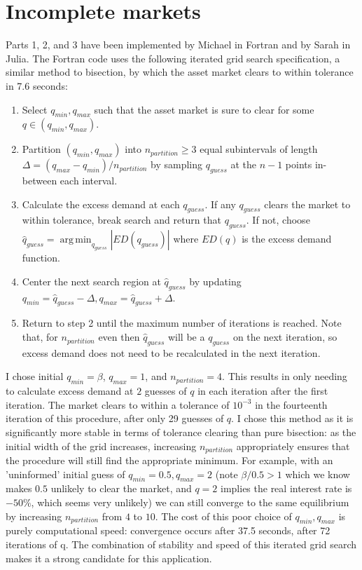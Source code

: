\documentclass[11pt]{article} %
\DeclareMathOperator*{\argmin}{arg\,min}
\begin{document}
\section{Incomplete markets}
Parts 1, 2, and 3 have been implemented by Michael in Fortran and by Sarah in Julia. The Fortran code uses the following iterated grid search specification, a similar method to bisection, by which the asset market clears to within tolerance in 7.6 seconds:
\begin{enumerate}
\item Select $q_{min}, q_{max}$ such that the asset market is sure to clear for some $q \in (q_{min},q_{max})$.
\item Partition $(q_{min},q_{max})$ into $n_{partition}\geq 3$ equal subintervals of length $\Delta = (q_{max}-q_{min})/n_{partition}$ by sampling $q_{guess}$ at the $n-1$ points in-between each interval.
\item Calculate the excess demand at each $q_{guess}$. If any $q_{guess}$ clears the market to within tolerance, break search and return that $q_{guess}$. If not, choose $\hat{q}_{guess} = \argmin_{q_{guess}} |ED(q_{guess})|$ where $ED(q)$ is the excess demand function.
\item Center the next search region at $\hat{q}_{guess}$ by updating $q_{min} = \hat{q}_{guess} - \Delta, q_{max} = \hat{q}_{guess} + \Delta$.
\item Return to step 2 until the maximum number of iterations is reached. Note that, for $n_{partition}$ even then $\hat{q}_{guess}$ will be a $q_{guess}$ on the next iteration, so excess demand does not need to be recalculated in the next iteration.
\end{enumerate}

I chose initial $q_{min} = \beta$, $q_{max} = 1$, and $n_{partition} = 4$. This results in only needing to calculate excess demand at $2$ guesses of $q$ in each iteration after the first iteration. The market clears to within a tolerance of $10^{-3}$ in the fourteenth iteration of this procedure, after only 29 guesses of $q$. I chose this method as it is significantly more stable in terms of tolerance clearing than pure bisection: as the initial width of the grid increases, increasing $n_{partition}$ appropriately ensures that the procedure will still find the appropriate minimum. For example, with an 'uninformed' initial guess of $q_{min}=0.5,q_{max} = 2$ (note $\beta/0.5>1$ which we know makes $0.5$ unlikely to clear the market, and $q=2$ implies the real interest rate is $-50\%$, which seems very unlikely) we can still converge to the same equilibrium by increasing $n_{partition}$ from $4$ to $10$. The cost of this poor choice of $q_{min},q_{max}$ is purely computational speed: convergence occurs after 37.5 seconds, after 72 iterations of q. The combination of stability and speed of this iterated grid search makes it a strong candidate for this application.
\end{document}
